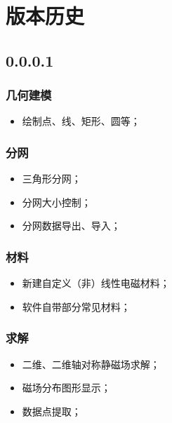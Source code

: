 \chapter{版本历史}

\section{0.0.0.1}
\subsection{几何建模}
\begin{itemize}   
    \item 绘制点、线、矩形、圆等；
\end{itemize}
\subsection{分网}
\begin{itemize}   
    \item 三角形分网；
    \item 分网大小控制；
    \item 分网数据导出、导入；
\end{itemize}
\subsection{材料}
\begin{itemize}   
    \item 新建自定义（非）线性电磁材料；
    \item 软件自带部分常见材料；
\end{itemize}
\subsection{求解}
\begin{itemize}   
    \item 二维、二维轴对称静磁场求解；
    \item 磁场分布图形显示；
    \item 数据点提取；
\end{itemize}